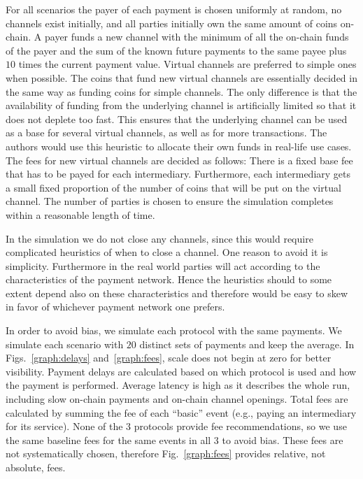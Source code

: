   For all scenarios the payer of each payment is chosen uniformly at
  random, no channels exist initially, and all parties initially own the same
  amount of coins on-chain. A payer funds a new channel with the minimum of all
  the on-chain funds of the payer and the sum of the known future payments to
  the same payee plus $10$ times the current payment value. Virtual channels
  are preferred to simple ones when possible.
  The coins that fund new virtual channels are essentially decided in the same way as funding coins for simple channels. The only difference is that the availability of funding from the underlying channel is artificially limited so that it does not deplete too fast. This ensures that the underlying channel can be used as a base for several virtual channels, as well as for more transactions. The authors would use this heuristic to allocate their own funds in real-life use cases.
  The fees for new virtual channels are decided as follows: There is a fixed base fee that has to be payed for each intermediary. Furthermore, each intermediary gets a small fixed proportion of the number of coins that will be put on the virtual channel.
  The
  number of parties is chosen to ensure the simulation completes within a
  reasonable length of time.

  In the simulation we do not close any channels, since this would require
  complicated heuristics of when to close a channel. One reason to avoid it is
  simplicity. Furthermore in the real world parties will act according to the
  characteristics of the payment network. Hence the heuristics should to some
  extent depend also on these characteristics and therefore would be easy to
  skew in favor of whichever payment network one prefers.

  In order to avoid bias, we simulate each
  protocol with the same payments. We simulate each scenario with $20$
  distinct sets of payments and keep the average.
  In Figs.~\ref{graph:delays} and~\ref{graph:fees}, scale does not begin at zero
  for better visibility. Payment
  delays are calculated based on which protocol is used and how the payment is
  performed. Average
  latency is high as it describes the whole run, including slow on-chain
  payments and on-chain channel openings. Total fees are calculated by summing the fee
  of each ``basic'' event (e.g., paying an intermediary for its service). None
  of the $3$ protocols provide fee recommendations, so we use the same baseline
  fees for the same events in all $3$ to avoid bias. These
  fees are not systematically chosen, therefore Fig.~\ref{graph:fees} provides
  relative, not absolute, fees.

